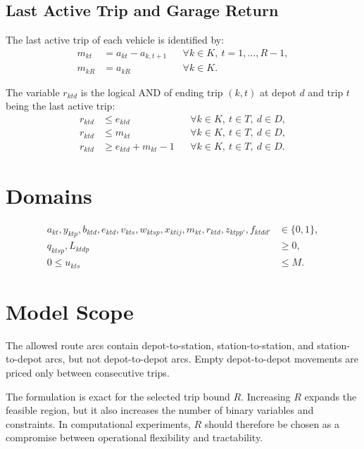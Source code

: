 \documentclass[11pt,a4paper]{article}
\begin{document}
\subsection{Last Active Trip and Garage Return}

The last active trip of each vehicle is identified by:
\begin{align}
    m_{kt} &= a_{kt}-a_{k,t+1}
        && \forall k \in K,\ t=1,\ldots,R-1, \label{eq:last-trip-middle}\\
    m_{kR} &= a_{kR}
        && \forall k \in K. \label{eq:last-trip-final}
\end{align}

The variable \(r_{ktd}\) is the logical AND of ending trip \((k,t)\) at depot
\(d\) and trip \(t\) being the last active trip:
\begin{align}
    r_{ktd} &\leq e_{ktd}
        && \forall k \in K,\ t \in T,\ d \in D, \label{eq:return-end}\\
    r_{ktd} &\leq m_{kt}
        && \forall k \in K,\ t \in T,\ d \in D, \label{eq:return-last}\\
    r_{ktd} &\geq e_{ktd}+m_{kt}-1
        && \forall k \in K,\ t \in T,\ d \in D. \label{eq:return-and}
\end{align}

\section{Domains}

\begin{align}
    a_{kt}, y_{ktp}, b_{ktd}, e_{ktd}, v_{kts}, w_{ktsp}, x_{ktij},
    m_{kt}, r_{ktd}, z_{ktpp'}, f_{ktdd'} &\in \{0,1\}, \\
    q_{ktsp}, L_{ktdp} &\geq 0, \\
    0 \leq u_{kts} &\leq M.
\end{align}

\section{Model Scope}

The allowed route arcs contain
depot-to-station, station-to-station, and station-to-depot arcs, but not
depot-to-depot arcs. Empty depot-to-depot movements are priced only between
consecutive trips.

The formulation is exact for the selected trip bound \(R\). Increasing \(R\)
expands the feasible region, but it also increases the number of binary
variables and constraints. In computational experiments, \(R\) should therefore
be chosen as a compromise between operational flexibility and tractability.
\end{document}
